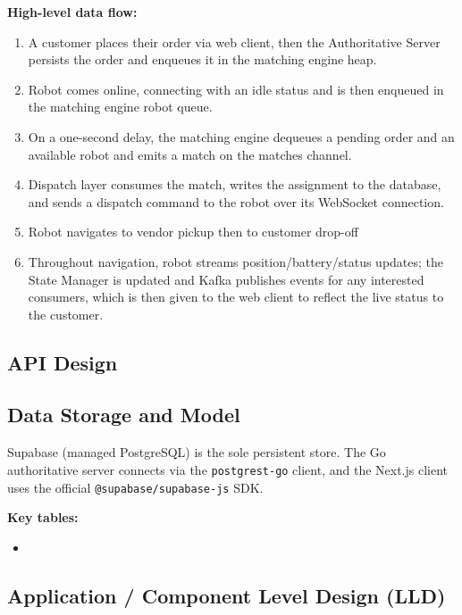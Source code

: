 \documentclass[12pt,a4paper]{article}
\begin{document}
\textbf{High-level data flow:}
\begin{enumerate}
  \item A customer places their order via web client, then the Authoritative Server persists the order and enqueues it in the matching engine heap.
  \item Robot comes online, connecting with an idle status and is then enqueued in the matching engine robot queue.
  \item On a one-second delay, the matching engine dequeues a pending order and an available robot and emits a match on the matches channel.
  \item Dispatch layer consumes the match, writes the assignment to the database, and sends a dispatch command to the robot over its WebSocket connection.
  \item Robot navigates to vendor pickup then to customer drop-off
  \item Throughout navigation, robot streams position/battery/status updates; the State Manager is updated and Kafka publishes events for any interested consumers, which is then given to the web client to reflect the live status to the customer.
\end{enumerate}

\subsection{API Design}

\subsection{Data Storage and Model}
Supabase (managed PostgreSQL) is the sole persistent store. The Go authoritative server connects via the \texttt{postgrest-go} client, and the Next.js client uses the official \texttt{@supabase/supabase-js} SDK.

\textbf{Key tables:}
\begin{itemize}
  \item 
\end{itemize}

\subsection{Application / Component Level Design (LLD)}

\newpage
\end{document}
